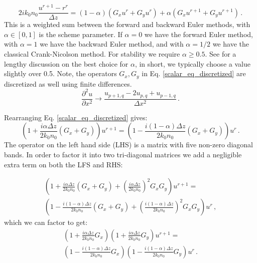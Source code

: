 \documentclass[]{article}
\begin{document}
	\begin{equation}
		2ik_0 n_0 \frac{u^{r+1}-r^r}{\Delta z} = (1-\alpha)\left( G_x u^r+G_y u^r\right) +\alpha\left( G_x u^{r+1}+G_y u^{r+1}\right)\, .
		\label{scalar_eq_discretized}
	\end{equation}
	This is a weighted sum between the forward and backward Euler methods, with $\alpha\in[0,1]$ is the scheme parameter. If $\alpha=0$ we have the forward Euler method, with $\alpha=1$ we have the backward Euler method, and with $\alpha=1/2$ we have the classical Crank-Nicolson method. For stability we require $\alpha \ge 0.5$. See \cite{Lifante_2015} for a lengthy discussion on the best choice for $\alpha$, in short, we typically choose a value slightly over 0.5. Note, the operators $G_x, G_y$ in Eq. \eqref{scalar_eq_discretized} are discretized as well using finite differences.
	\begin{equation}
		\frac{\partial^2 u}{\partial x^2} \to \frac{u_{p+1,q}-2u_{p,q}+u_{p-1,q}}{\Delta x^2}\, .
		\label{double_derivative}
	\end{equation}
	
	Rearranging Eq. \eqref{scalar_eq_discretized} gives:
	\begin{equation}
		\left(1+\frac{i\alpha \Delta z}{2k_0 n_0}(G_x+G_y) \right) u^{r+1} = \left(1-\frac{i(1-\alpha) \Delta z}{2k_0 n_0}(G_x+G_y) \right) u^r \, .
	\end{equation}
	The operator on the left hand side (LHS) is a matrix with five non-zero diagonal bands. In order to factor it into two tri-diagonal matrices we add a negligible extra term on both the LFS and RHS:
	
	\begin{multline*}
		\left(1+\frac{i\alpha \Delta z}{2k_0 n_0}(G_x+G_y) + \left(\frac{i\alpha \Delta z}{2k_0 n_0} \right) ^2 G_x G_y \right) u^{r+1} =\\
		 \left(1-\frac{i(1-\alpha) \Delta z}{2k_0 n_0}(G_x+G_y) +\left( \frac{i(1-\alpha) \Delta z}{2k_0 n_0}\right)^2 G_x G_y \right) u^r \, ,
	\end{multline*}
	which we can factor to get:
	\begin{multline}
		\left(1+\frac{i\alpha \Delta z}{2k_0 n_0}G_x \right)\left(1+\frac{i\alpha \Delta z}{2k_0 n_0}G_y \right) u^{r+1} = \\
		\left(1-\frac{i(1-\alpha) \Delta z}{2k_0 n_0}G_x \right)\left(1-\frac{i(1-\alpha) \Delta z}{2k_0 n_0}G_y \right) u^r \, .
		\label{ADI_setup}
	\end{multline}
	
\end{document}
